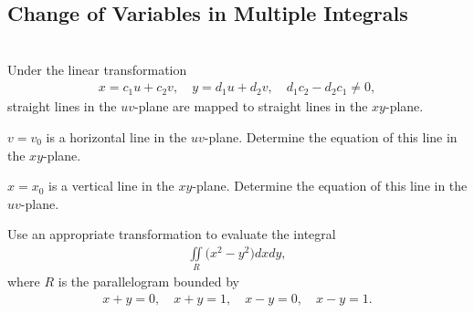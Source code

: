 \subsection{Change of Variables in Multiple Integrals}
\BEN
\item %
 \\
Under the linear transformation 
\begin{align*}
  x = c_1u + c_2v , \quad y =d_1u + d_2v, \quad d_1c_2 - d_2c_1 \ne 0,
\end{align*}
straight lines in the $uv$-plane are mapped to straight lines in the $xy$-plane. 
\BEN
\item $v=v_0$ is a horizontal line in the $uv$-plane. Determine the equation of this line in the $xy$-plane. 
\item $x=x_0$ is a vertical line in the $xy$-plane. Determine the equation of this line in the $uv$-plane.
\EEN
\item %
Use an appropriate transformation to evaluate the integral
\begin{align*}
  \iint\limits_R \big(x^2 - y^2\big) dxdy,
\end{align*}
where $R$ is the parallelogram bounded by 
\begin{align*}
  x+y = 0, \quad x+y = 1, \quad x-y=0, \quad x-y=1.
\end{align*}

